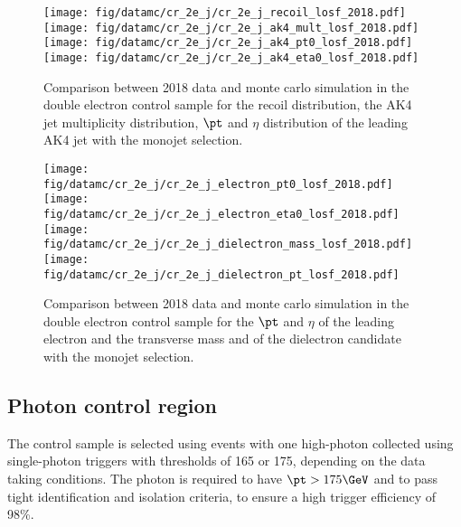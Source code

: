 \begin{figure}[htbp]
    \begin{center}
        \texttt{[image: fig/datamc/cr\_2e\_j/cr\_2e\_j\_recoil\_losf\_2018.pdf]}
        \texttt{[image: fig/datamc/cr\_2e\_j/cr\_2e\_j\_ak4\_mult\_losf\_2018.pdf]} \\
        \texttt{[image: fig/datamc/cr\_2e\_j/cr\_2e\_j\_ak4\_pt0\_losf\_2018.pdf]}
        \texttt{[image: fig/datamc/cr\_2e\_j/cr\_2e\_j\_ak4\_eta0\_losf\_2018.pdf]}
    \end{center}
    \caption{Comparison between 2018 data and monte carlo simulation in the double electron control sample for
        the recoil distribution, the AK4 jet multiplicity distribution,  $\pt$ and $\eta$ distribution
        of the leading AK4  jet with the monojet selection.}
    \label{fig:DE_monojet_2018}
\end{figure}

\begin{figure}[htbp]
    \begin{center}
        \texttt{[image: fig/datamc/cr\_2e\_j/cr\_2e\_j\_electron\_pt0\_losf\_2018.pdf]}
        \texttt{[image: fig/datamc/cr\_2e\_j/cr\_2e\_j\_electron\_eta0\_losf\_2018.pdf]} \\
        \texttt{[image: fig/datamc/cr\_2e\_j/cr\_2e\_j\_dielectron\_mass\_losf\_2018.pdf]}
        \texttt{[image: fig/datamc/cr\_2e\_j/cr\_2e\_j\_dielectron\_pt\_losf\_2018.pdf]}
    \end{center}
    \caption{Comparison between 2018 data and monte carlo simulation in the double electron control sample for
        the $\pt$ and $\eta$ of the leading electron and the transverse mass and \pt of the dielectron candidate with the monojet selection.}
    \label{fig:DE2_monojet_2018}
\end{figure}

\newpage

\subsection{Photon control region}
\label{sec:selection_cr_g}

The \phojets control sample is selected using events with one high-\pt photon collected using single-photon triggers with \pt thresholds of 165 or 175\GeV, depending
on the data taking conditions. The photon is required to have $\pt > 175\GeV$ and to pass tight identification and isolation criteria, to ensure a high trigger efficiency of 98\%. 

